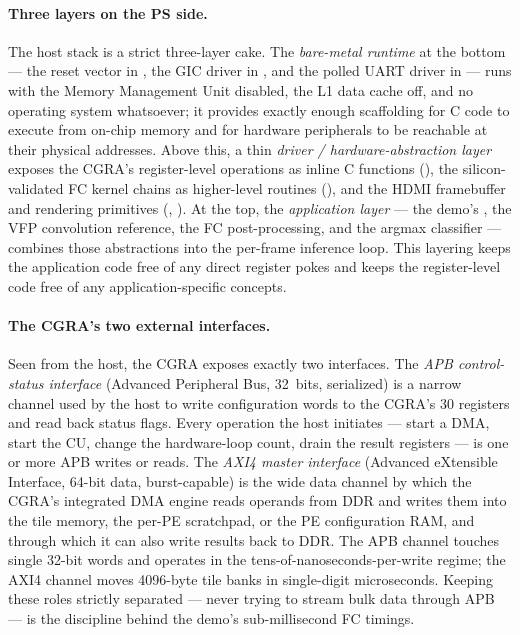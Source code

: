 \paragraph{Three layers on the PS side.}
The host stack is a strict three-layer cake. The \emph{bare-metal
runtime} at the bottom --- the reset vector in , the GIC
driver in , and the polled UART driver in
 --- runs with the Memory Management Unit disabled, the
L1 data cache off, and no operating system whatsoever; it provides
exactly enough scaffolding for C code to execute from on-chip memory
and for hardware peripherals to be reachable at their physical
addresses. Above this, a thin \emph{driver / hardware-abstraction
layer} exposes the CGRA's register-level operations as inline C
functions (), the silicon-validated FC kernel chains as
higher-level routines (), and the HDMI
framebuffer and rendering primitives (,
). At the top, the \emph{application layer} --- the
demo's , the VFP convolution reference, the FC
post-processing, and the argmax classifier --- combines those
abstractions into the per-frame inference loop. This layering keeps
the application code free of any direct register pokes and keeps the
register-level code free of any application-specific concepts.

\paragraph{The CGRA's two external interfaces.}
Seen from the host, the CGRA exposes exactly two interfaces. The
\emph{APB control-status interface} (Advanced Peripheral Bus, 32~bits,
serialized) is a narrow channel used by the host to write configuration
words to the CGRA's 30 registers and read back status flags. Every
operation the host initiates --- start a DMA, start the CU, change the
hardware-loop count, drain the result registers --- is one or more APB
writes or reads. The \emph{AXI4 master interface} (Advanced eXtensible
Interface, 64-bit data, burst-capable) is the wide data channel by
which the CGRA's integrated DMA engine reads operands from DDR and
writes them into the tile memory, the per-PE scratchpad, or the PE
configuration RAM, and through which it can also write results back
to DDR. The APB channel touches single 32-bit words and operates in
the tens-of-nanoseconds-per-write regime; the AXI4 channel moves
4096-byte tile banks in single-digit microseconds. Keeping these
roles strictly separated --- never trying to stream bulk data through
APB --- is the discipline behind the demo's sub-millisecond FC
timings.

